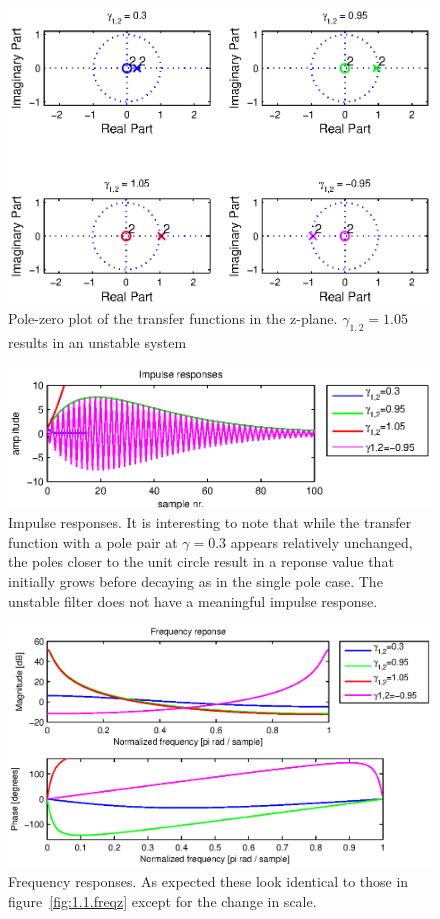 \begin{figure}
	\center
	\includegraphics{./picture/ha6_1_2_zplane.eps}
	\caption{Pole-zero plot of the transfer functions in the z-plane. \(\gamma_{1,2}=1.05\) results in an unstable system}
	\label{fig:1.2.zplane}
\end{figure}

\begin{figure}
	\center
	\includegraphics{./picture/ha6_1_2_impz.eps}
	\caption{Impulse responses. It is interesting to note that while the transfer function with a pole pair at \(\gamma=0.3\) appears relatively unchanged, the poles closer to the unit circle result in a reponse value that initially grows before decaying as in the single pole case. The unstable filter does not have a meaningful impulse response.}
	\label{fig:1.2.impz}
\end{figure}

\begin{figure}
	\center
	\includegraphics{./picture/ha6_1_2_freqz.eps}
	\caption{Frequency responses. As expected these look identical to those in figure~\ref{fig:1.1.freqz} except for the change in scale.}
	\label{fig:1.2.freqz}
\end{figure}

